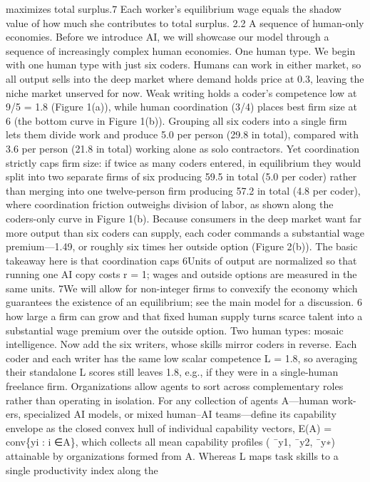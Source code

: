 maximizes total surplus.7 Each worker’s equilibrium wage equals the shadow value
of how much she contributes to total surplus.
2.2 A sequence of human-only economies. Before we introduce AI, we will showcase
our model through a sequence of increasingly complex human economies.
One human type. We begin with one human type with just six coders. Humans can
work in either market, so all output sells into the deep market where demand holds
price at 0.3, leaving the niche market unserved for now. Weak writing holds a coder’s
competence low at 9/5 = 1.8 (Figure 1(a)), while human coordination (3/4) places
best firm size at 6 (the bottom curve in Figure 1(b)). Grouping all six coders into a
single firm lets them divide work and produce 5.0 per person (29.8 in total), compared
with 3.6 per person (21.8 in total) working alone as solo contractors. Yet coordination
strictly caps firm size: if twice as many coders entered, in equilibrium they would
split into two separate firms of six producing 59.5 in total (5.0 per coder) rather than
merging into one twelve-person firm producing 57.2 in total (4.8 per coder), where
coordination friction outweighs division of labor, as shown along the coders-only
curve in Figure 1(b).
Because consumers in the deep market want far more output than six coders can
supply, each coder commands a substantial wage premium—1.49, or roughly six times
her outside option (Figure 2(b)). The basic takeaway here is that coordination caps
6Units of output are normalized so that running one AI copy costs r = 1; wages and outside options
are measured in the same units.
7We will allow for non-integer firms to convexify the economy which guarantees the existence of an
equilibrium; see the main model for a discussion.
6
how large a firm can grow and that fixed human supply turns scarce talent into a
substantial wage premium over the outside option.
Two human types: mosaic intelligence. Now add the six writers, whose skills mirror
coders in reverse. Each coder and each writer has the same low scalar competence
L = 1.8, so averaging their standalone L scores still leaves 1.8, e.g., if they were in a
single-human freelance firm. Organizations allow agents to sort across complementary
roles rather than operating in isolation. For any collection of agents A—human work-
ers, specialized AI models, or mixed human–AI teams—define its capability envelope as
the closed convex hull of individual capability vectors,
E(A) = conv\{yi : i ∈A\},
which collects all mean capability profiles ( ¯y1, ¯y2, ¯y∗) attainable by organizations
formed from A. Whereas L maps task skills to a single productivity index along the
